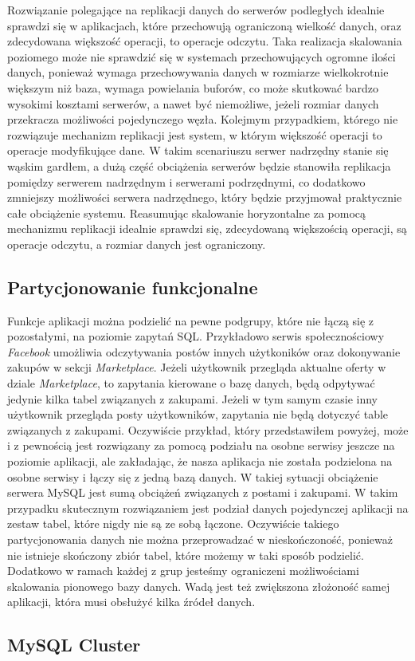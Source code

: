 Rozwiązanie polegające na replikacji danych do serwerów podległych idealnie sprawdzi się w aplikacjach, które przechowują ograniczoną wielkość danych, oraz zdecydowana większość operacji, to operacje odczytu. Taka realizacja skalowania poziomego może nie sprawdzić się w systemach przechowujących ogromne ilości danych, ponieważ wymaga przechowywania danych w rozmiarze wielkokrotnie większym niż baza, wymaga powielania buforów, co może skutkować bardzo wysokimi kosztami serwerów, a nawet być niemożliwe, jeżeli rozmiar danych przekracza możliwości pojedynczego węzła. Kolejmym przypadkiem, którego nie rozwiązuje mechanizm replikacji jest system, w którym większość operacji to operacje modyfikujące dane. W takim scenariuszu serwer nadrzędny stanie się wąskim gardłem, a dużą część obciążenia serwerów będzie stanowiła replikacja pomiędzy serwerem nadrzędnym i serwerami podrzędnymi, co dodatkowo zmniejszy możliwości serwera nadrzędnego, który będzie przyjmował praktycznie całe obciążenie systemu. Reasumując skalowanie horyzontalne za pomocą mechanizmu replikacji idealnie sprawdzi się, zdecydowaną większością operacji, są operacje odczytu, a rozmiar danych jest ograniczony.

\subsection{Partycjonowanie funkcjonalne}

Funkcje aplikacji można podzielić na pewne podgrupy, które nie łączą się z pozostałymi, na poziomie zapytań SQL. Przykładowo serwis społecznościowy \textit{Facebook} umożliwia odczytywania postów innych użytkoników oraz dokonywanie zakupów w sekcji \textit{Marketplace}. Jeżeli użytkownik przegląda aktualne oferty w dziale \textit{Marketplace}, to zapytania kierowane o bazę danych, będą odpytywać jedynie kilka tabel związanych z zakupami. Jeżeli w tym samym czasie inny użytkownik przegląda posty użytkowników, zapytania nie będą dotyczyć table związanych z zakupami. Oczywiście przykład, który przedstawiłem powyżej, może i z pewnością jest rozwiązany za pomocą podziału na osobne serwisy jeszcze na poziomie aplikacji, ale zakładając, że nasza aplikacja nie została podzielona na osobne serwisy i łączy się z jedną bazą danych. W takiej sytuacji obciążenie serwera MySQL jest sumą obciążeń związanych z postami i zakupami. W takim przypadku skutecznym rozwiązaniem jest podział danych pojedynczej aplikacji na zestaw tabel, które nigdy nie są ze sobą łączone. Oczywiście takiego partycjonowania danych nie można przeprowadzać w nieskończoność, ponieważ nie istnieje skończony zbiór tabel, które możemy w taki sposób podzielić. Dodatkowo w ramach każdej z grup jesteśmy ograniczeni możliwościami skalowania pionowego bazy danych. Wadą jest też zwiększona złożoność samej aplikacji, która musi obsłużyć kilka źródeł danych. 



\subsection{MySQL Cluster}
